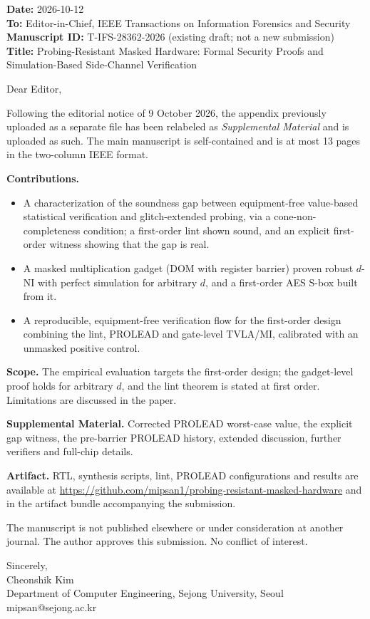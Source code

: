 \documentclass[a4paper,11pt]{article}
\begin{document}
\textbf{Date:} 2026-10-12\\
\textbf{To:} Editor-in-Chief, IEEE Transactions on Information Forensics and Security\\
\textbf{Manuscript ID:} T-IFS-28362-2026 (existing draft; not a new submission)\\
\textbf{Title:} Probing-Resistant Masked Hardware: Formal Security Proofs and Simulation-Based Side-Channel Verification

Dear Editor,

Following the editorial notice of 9 October 2026, the appendix previously uploaded as a separate file has been relabeled as \emph{Supplemental Material} and is uploaded as such. The main manuscript is self-contained and is at most 13 pages in the two-column IEEE format.

\textbf{Contributions.}
\begin{itemize}\itemsep0.1em
\item A characterization of the soundness gap between equipment-free value-based statistical verification and glitch-extended probing, via a cone-non-completeness condition; a first-order lint shown sound, and an explicit first-order witness showing that the gap is real.
\item A masked multiplication gadget (DOM with register barrier) proven robust $d$-NI with perfect simulation for arbitrary $d$, and a first-order AES S-box built from it.
\item A reproducible, equipment-free verification flow for the first-order design combining the lint, PROLEAD and gate-level TVLA/MI, calibrated with an unmasked positive control.
\end{itemize}

\textbf{Scope.} The empirical evaluation targets the first-order design; the gadget-level proof holds for arbitrary $d$, and the lint theorem is stated at first order. Limitations are discussed in the paper.

\textbf{Supplemental Material.} Corrected PROLEAD worst-case value, the explicit gap witness, the pre-barrier PROLEAD history, extended discussion, further verifiers and full-chip details.

\textbf{Artifact.} RTL, synthesis scripts, lint, PROLEAD configurations and results are available at \url{https://github.com/mipsan1/probing-resistant-masked-hardware} and in the artifact bundle accompanying the submission.

The manuscript is not published elsewhere or under consideration at another journal. The author approves this submission. No conflict of interest.

Sincerely,\\
Cheonshik Kim\\
Department of Computer Engineering, Sejong University, Seoul\\
mipsan@sejong.ac.kr
\end{document}

